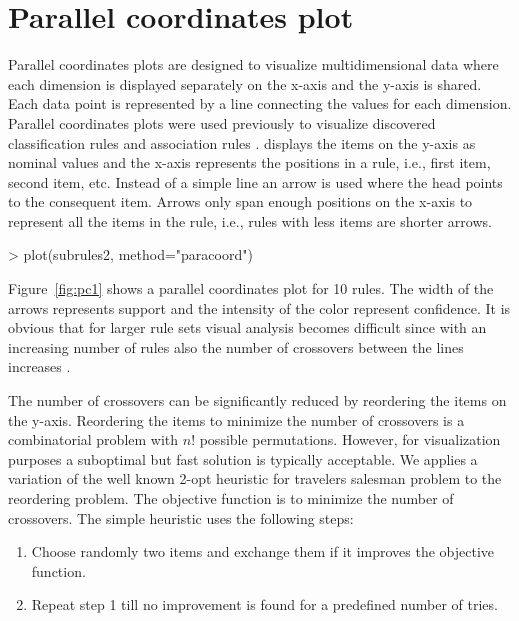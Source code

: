 \documentclass[nojss]{jss}
\begin{document}
\section{Parallel coordinates plot}

Parallel coordinates plots are designed to visualize multidimensional data
where each dimension is displayed separately on the x-axis and the
y-axis is shared. Each data point is represented by a line
connecting the values for each
dimension.
Parallel coordinates plots were used previously to visualize
discovered classification rules \citep{arulesViz:cviz}
and association rules \citep{arulesViz:Yang:2003}. \cite{arulesViz:Yang:2003}
displays the items on the y-axis as nominal values and the x-axis represents
the positions in a rule, i.e., first item, second item, etc.  Instead of a
simple line an arrow is used where the head points to the consequent item.
Arrows only span enough positions on the x-axis to represent all the items in
the rule, i.e., rules with less items are shorter arrows.

\begin{Schunk}
\begin{Sinput}
> plot(subrules2, method="paracoord")
\end{Sinput}
\end{Schunk}

Figure~\ref{fig:pc1} shows a parallel coordinates plot for 10 rules.
The width of the arrows represents support and the intensity of the color
represent confidence.
It is obvious that
for larger rule sets
visual analysis
becomes difficult since with an increasing number of rules also
the number of crossovers
between the lines increases \cite{arulesViz:Yang:2003}.

The number of crossovers can be significantly reduced by reordering the items
on the y-axis. Reordering the items to minimize the number of
crossovers is a combinatorial problem with $n!$ possible permutations.
However, for visualization purposes a suboptimal but fast solution is
typically acceptable. We applies a variation of the well known
2-opt heuristic
\cite{arulesViz:Bently:1990} for travelers salesman problem
to the reordering problem. The objective function is to minimize the
number of crossovers. The simple heuristic uses the following steps:
\begin{enumerate}
\item Choose randomly two items and exchange them if it improves the
objective function.
\item Repeat step 1 till no improvement is found for a predefined number
of tries.
\end{enumerate}
\end{document}

